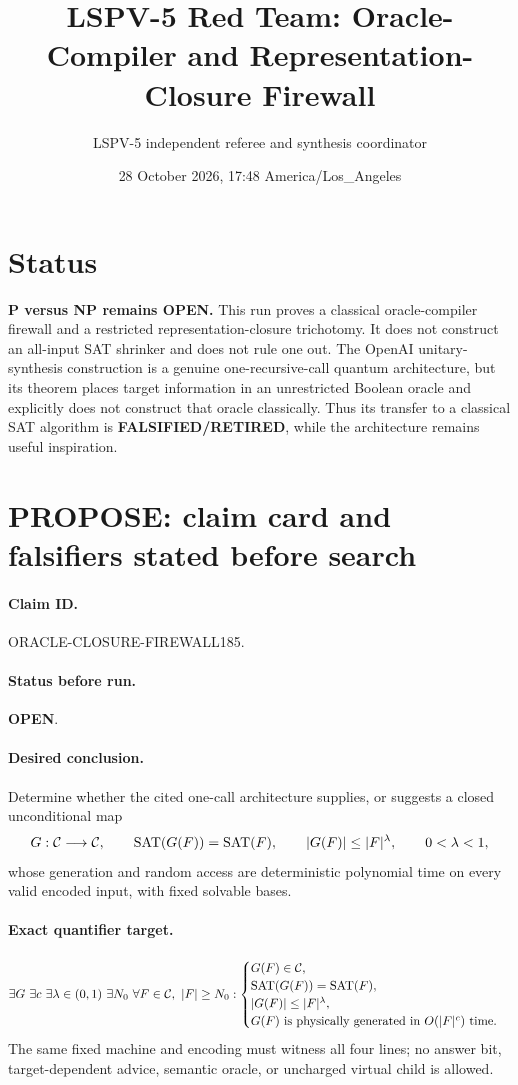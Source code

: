\documentclass[11pt]{article}
\title{LSPV-5 Red Team: Oracle-Compiler and Representation-Closure Firewall}
\author{LSPV-5 independent referee and synthesis coordinator}
\date{28 October 2026, 17:48 America/Los\_Angeles}
\newcommand{\OPEN}{\textbf{OPEN}}
\newcommand{\FALSIFIED}{\textbf{FALSIFIED/RETIRED}}
\begin{document}
\sloppy
\maketitle

\section*{Status}
\noindent\textbf{P versus NP remains OPEN.}
This run proves a classical oracle-compiler firewall and a restricted
representation-closure trichotomy.  It does not construct an all-input SAT
shrinker and does not rule one out.  The OpenAI unitary-synthesis construction
is a genuine one-recursive-call quantum architecture, but its theorem places
target information in an unrestricted Boolean oracle and explicitly does not
construct that oracle classically.  Thus its transfer to a classical SAT
algorithm is \FALSIFIED, while the architecture remains useful inspiration.

\section{PROPOSE: claim card and falsifiers stated before search}
\paragraph{Claim ID.} ORACLE-CLOSURE-FIREWALL185.
\paragraph{Status before run.} \OPEN.
\paragraph{Desired conclusion.} Determine whether the cited one-call architecture
supplies, or suggests a closed unconditional map
\[
 G:{\cal C}\longrightarrow {\cal C},\qquad
 \operatorname{SAT}(G(F))=\operatorname{SAT}(F),\qquad
 |G(F)|\le |F|^\lambda,\qquad 0<\lambda<1,
\]
whose generation and random access are deterministic polynomial time on every
valid encoded input, with fixed solvable bases.
\paragraph{Exact quantifier target.}
\[
 \exists G\ \exists c\ \exists\lambda\in(0,1)\ \exists N_0\
 \forall F\in{\cal C},\ |F|\ge N_0:
 \begin{cases}
 G(F)\in{\cal C},\\
 \operatorname{SAT}(G(F))=\operatorname{SAT}(F),\\
 |G(F)|\le |F|^\lambda,\\
 G(F)\text{ is physically generated in }O(|F|^c)\text{ time.}
 \end{cases}
\]
The same fixed machine and encoding must witness all four lines; no answer bit,
target-dependent advice, semantic oracle, or uncharged virtual child is allowed.
\end{document}
